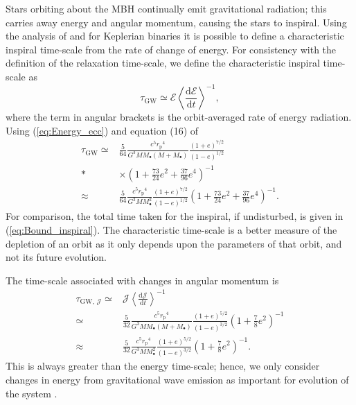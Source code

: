 \documentclass[useAMS,usedcolumn,usegraphicx,usenatbib]{mn2e}
\newcommand{\eqnref}[1]{(\ref{eq:#1})}
\newcommand{\sub}[1]{\ensuremath{_\mathrm{#1}}}
\newcommand{\dd}{\ensuremath{\mathrm{d}}}
\newcommand{\diff}[2]{\ensuremath{\frac{\dd {#1}}{\dd {#2}}}}
\begin{document}
Stars orbiting about the MBH continually emit gravitational radiation; this carries away energy and angular momentum, causing the stars to inspiral. Using the analysis of \citet{Peters1963} and \citet{Peters1964} for Keplerian binaries it is possible to define a characteristic inspiral time-scale from the rate of change of energy. For consistency with the definition of the relaxation time-scale, we define the characteristic inspiral time-scale as \citep{MiraldaEscude2000, Merritt2011}
\begin{equation}
\tau\sub{GW} \simeq \mathcal{E}\left\langle\diff{\mathcal{E}}{t}\right\rangle^{-1},
\label{eq:tGW-def}
\end{equation}
where the term in angular brackets is the orbit-averaged rate of energy radiation. Using \eqnref{Energy_ecc} and equation (16) of \citet{Peters1963}
\begin{align}
\tau\sub{GW} \simeq {} & \frac{5}{64}\frac{c^5r\sub{p}^4}{G^3MM_\bullet\left(M + M_\bullet\right)}\frac{(1+e)^{7/2}}{(1-e)^{1/2}} \nonumber \\*
 {} & \times {} \left(1+\frac{73}{24}e^2 + \frac{37}{96}e^4\right)^{-1} \\
 \approx {} & \frac{5}{64}\frac{c^5r\sub{p}^4}{G^3MM_\bullet^2}\frac{(1+e)^{7/2}}{(1-e)^{1/2}}\left(1+\frac{73}{24}e^2 + \frac{37}{96}e^4\right)^{-1}.
\end{align}
For comparison, the total time taken for the inspiral, if undisturbed, is given in \eqnref{Bound_inspiral}. The characteristic time-scale is a better measure of the depletion of an orbit as it only depends upon the parameters of that orbit, and not its future evolution.

The time-scale associated with changes in angular momentum is \citep{Peters1964}
\begin{align}
\tau_{\mathrm{GW},\, \mathcal{J}} \simeq {} & \mathcal{J}\left\langle\diff{\mathcal{J}}{t}\right\rangle^{-1} \\
 \simeq {} & \frac{5}{32}\frac{c^5r\sub{p}^4}{G^3MM_\bullet\left(M + M_\bullet\right)}\frac{(1+e)^{5/2}}{(1-e)^{3/2}}\left(1+\frac{7}{8}e^2\right)^{-1} \\
 \approx {} & \frac{5}{32}\frac{c^5r\sub{p}^4}{G^3MM_\bullet^2}\frac{(1+e)^{5/2}}{(1-e)^{3/2}}\left(1+\frac{7}{8}e^2\right)^{-1}.
\end{align}
This is always greater than the energy time-scale; hence, we only consider changes in energy from gravitational wave emission as important for evolution of the system \citep{Hopman2005}.
\end{document}
